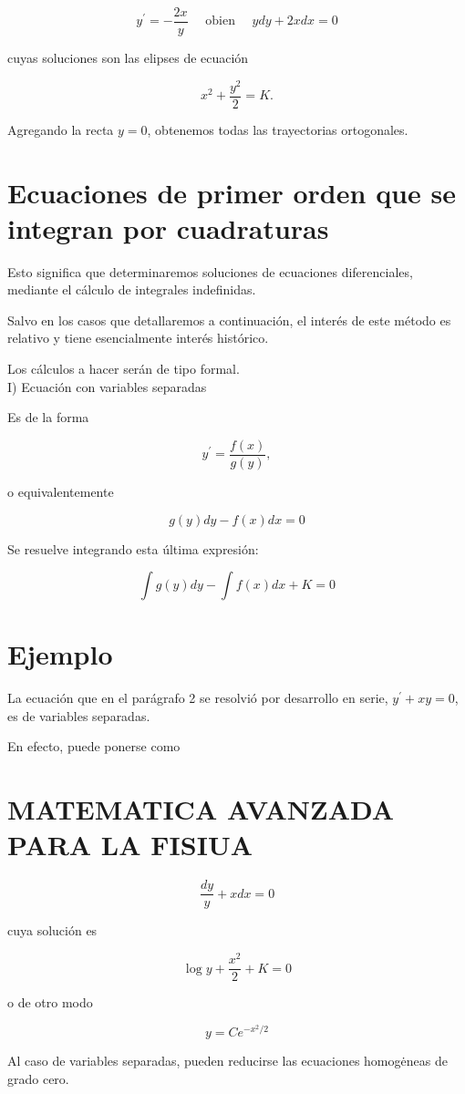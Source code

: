 \documentclass[10pt]{article}
\theoremstyle{plain}
\theoremstyle{definition}
\theoremstyle{remark}
\begin{document}
$$
y^{\prime}=-\frac{2 x}{y} \quad \text { obien } \quad y d y+2 x d x=0
$$

cuyas soluciones son las elipses de ecuación

$$
x^{2}+\frac{y^{2}}{2}=K .
$$

Agregando la recta $y=0$, obtenemos todas las trayectorias ortogonales.

\section{Ecuaciones de primer orden que se integran por cuadraturas}
Esto significa que determinaremos soluciones de ecuaciones diferenciales, mediante el cálculo de integrales indefinidas.

Salvo en los casos que detallaremos a continuación, el interés de este método es relativo y tiene esencialmente interés histórico.

Los cálculos a hacer serán de tipo formal.\\
I) Ecuación con variables separadas

Es de la forma


\begin{equation*}
y^{\prime}=\frac{f(x)}{g(y)}, \tag{4-1}
\end{equation*}


o equivalentemente

$$
g(y) d y-f(x) d x=0
$$

Se resuelve integrando esta última expresión:

$$
\int g(y) d y-\int f(x) d x+K=0
$$

\section*{Ejemplo}
La ecuación que en el parágrafo 2 se resolvió por desarrollo en serie, $y^{\prime}+x y=0$, es de variables separadas.

En efecto, puede ponerse como

\section*{MATEMATICA AVANZADA PARA LA FISIUA}
$$
\frac{d y}{y}+x d x=0
$$

cuya solución es

$$
\log y+\frac{x^{2}}{2}+K=0
$$

o de otro modo

$$
y=C e^{-x^{2} / 2}
$$

Al caso de variables separadas, pueden reducirse las ecuaciones homogėneas de grado cero.
\end{document}
